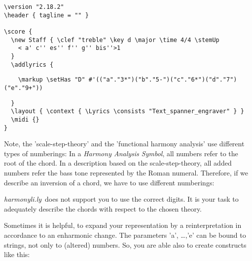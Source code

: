 \documentclass[
  DIV=calc,
  BCOR=5mm,
  12pt,
  headings=small,
  oneside,
  abstract=true,
  toc=bib,
  xcolor=dvipsnames,
  openany,
  ngerman,english]{scrartcl}
\newcommand{\hlyn}[0]{\textit{harmonyli.ly}}
\newcommand{\has}[1]{\textit{Harmony Analysis Symbol#1}}
\begin{document}
\begin{scriptsize}
\begin{verbatim}
\version "2.18.2"
\header { tagline = "" }

\score {
  \new Staff { \clef "treble" \key d \major \time 4/4 \stemUp 
    < a' c'' es'' f'' g'' bis''>1 
  }
  \addlyrics {
  \end{verbatim}
  { \color{red} \verb|    \markup \setHas "D" #'(("a"."3*")("b"."5-")("c"."6*")("d"."7")("e"."9+")) |
  }
\begin{verbatim}    
  }
  \layout { \context { \Lyrics \consists "Text_spanner_engraver" } }
  \midi {}
}
\end{verbatim}
\end{scriptsize}

Note, the 'scale-step-theory' and the 'functional harmony analysis' use
different types of numberings: In a \has{}, all numbers refer to the root of the
chord. In a description based on the scale-step-theory, all added numbers refer
the bass tone represented by the Roman numeral. Therefore, if we describe an
inversion of a chord, we have to use different numberings:

\begin{center}
\end{center}

\hlyn\ does not support you to use the correct digits. It is your task
to adequately describe the chords with respect to the chosen theory.

Sometimes it is helpful, to expand your representation by a reinterpretation in
accordance to an enharmonic change. The parameters 'a', \ldots,'e' can be bound
to strings, not only to (altered) numbers. So, you are able also to create
constructs like this:

\begin{center}
\end{center}
\end{document}
